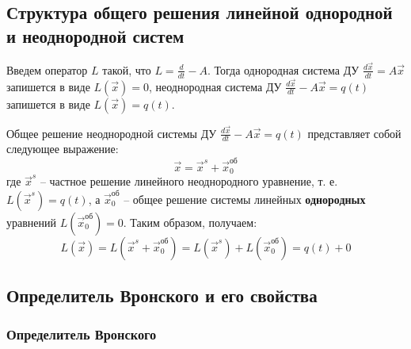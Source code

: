 \subsection{Структура общего решения линейной однородной и неоднородной систем}
Введем оператор $L$ такой, что $L = \frac{d}{dt} - A$. Тогда однородная система ДУ $\frac{d \vec x}{dt} = A \vec x$ запишется в виде
$L(\vec x) = 0$, неоднородная система ДУ $\frac{d \vec x}{dt} - A \vec x = q(t)$ запишется в виде $L(\vec x) = q(t)$.

\begin{proposition}
    Общее решение неоднородной системы ДУ $\frac{d \vec x}{dt} - A \vec x = q(t)$ представляет собой следующее выражение:
    \begin{equation}
        \vec x = \vec x^s + \vec x^{\text{об}}_0
    \end{equation}
    где $\vec x^s$ -- частное решение линейного неоднородного уравнение, т. е. $L(\vec x^s) = q(t)$, а
    $\vec x^{\text{об}}_0$ -- общее решение системы линейных \textbf{однородных} уравнений $L(\vec x^{\text{об}}_0) = 0$.
    Таким образом, получаем:
    \[L(\vec x) = L(\vec x^s + \vec x^{\text{об}}_0) = L(\vec x^s) + L(\vec x^{\text{об}}_0) = q(t) + 0\]
\end{proposition}

\subsection{Определитель Вронского и его свойства}

\subsubsection{Определитель Вронского}

